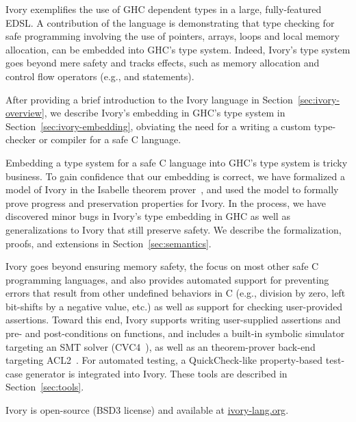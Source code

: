 Ivory exemplifies the use of GHC dependent types in a large, fully-featured
EDSL. A contribution of the language is demonstrating that type checking for
safe programming involving the use of pointers, arrays, loops and local memory
allocation, can be embedded into GHC's type system. Indeed, Ivory's type system
goes beyond mere safety and tracks effects, such as memory allocation and
control flow operators (e.g.,  and  statements).

After providing a brief introduction to the Ivory language in
Section~\ref{sec:ivory-overview}, we describe Ivory's embedding in GHC's type
system in Section~\ref{sec:ivory-embedding}, obviating the need for a writing a
custom type-checker or compiler for a safe C language.

Embedding a type system for a safe C language into GHC's type system is tricky
business. To gain confidence that our embedding is correct, we have formalized a
model of Ivory in the Isabelle theorem prover~\cite{isabelle}, and used the model to
formally prove progress and preservation properties for Ivory. In the process,
we have discovered minor bugs in Ivory's type embedding in GHC as well as
generalizations to Ivory that still preserve safety. We describe the
formalization, proofs, and extensions in Section~\ref{sec:semantics}.

Ivory goes beyond ensuring memory safety, the focus on most other safe C
programming languages, and also provides automated support for preventing errors
that result from other undefined behaviors in C (e.g., division by zero, left
bit-shifts by a negative value, etc.) as well as support for checking
user-provided assertions. Toward this end, Ivory supports writing user-supplied
assertions and pre- and post-conditions on functions, and includes a built-in
symbolic simulator targeting an SMT solver (CVC4~\cite{cvc4}), as well as an
theorem-prover back-end targeting ACL2~\cite{acl2}. For automated testing, a
QuickCheck-like property-based test-case generator is integrated into
Ivory. These tools are described in Section~\ref{sec:tools}.

Ivory is open-source (BSD3 license) and available at \url{ivory-lang.org}. 